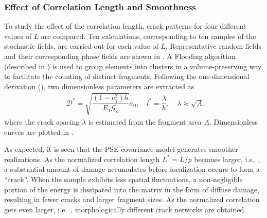 \subsubsection{Effect of Correlation Length and Smoothness}

To study the effect of the correlation length, crack patterns for four different values of $L$ are compared. Ten calculations, corresponding to ten samples of the stochastic fields, are carried out for each value of $L$. Representative random fields and their corresponding phase fields are shown in .
A Flooding algorithm (described in ) is used to group elements into clusters in a volume-preserving way, to facilitate the counting of distinct fragments. Following the one-dimensional derivation (), two dimensionless parameters are extracted as
\begin{align}
   & \mathcal{D}^* = \sqrt{\dfrac{(1-\nu_1^2)h}{E_1\underline{\mathcal{G}_c}}}\sigma_0, \quad l^* = \dfrac{\lambda}{h}, \quad \lambda \approx \sqrt{A} , 
\end{align}
where the crack spacing $\lambda$ is estimated from the fragment area $A$. Dimensionless curves are plotted in .

As expected, it is seen that the PSE covariance model generates smoother realizations. As the normalized correlation length $L^* = L/p$ becomes larger, i.e.\ ,
a substantial amount of damage accumulates before localization occurs to form a ``crack''. When the sample exhibits less spatial fluctuations, a non-negligible portion of the energy is dissipated into the matrix in the form of diffuse damage, resulting in fewer cracks and larger fragment sizes. As the normalized correlation gets even larger, i.e.\ , morphologically different crack networks are obtained.

